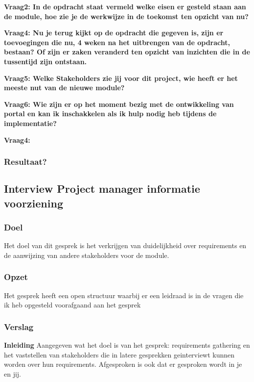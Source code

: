 \lipsum[01]
\bigskip

\textbf{Vraag2: In de opdracht staat vermeld welke eisen er gesteld staan aan de module, hoe zie je de werkwijze in de toekomst ten opzicht van nu?}

\lipsum[03]
\bigskip

\textbf{Vraag4: Nu je terug kijkt op de opdracht die gegeven is, zijn er toevoegingen die nu, 4 weken na het uitbrengen van de opdracht, bestaan? Of zijn er zaken veranderd ten opzicht van inzichten die in de tussentijd zijn ontstaan.}

\lipsum[05]
\bigskip

\textbf{Vraag5: Welke Stakeholders zie jij voor dit project, wie heeft er het meeste nut van de nieuwe module? }

\lipsum[06]
\bigskip

\textbf{Vraag6: Wie zijn er op het moment bezig met de ontwikkeling van portal en kan ik inschakkelen als ik hulp nodig heb tijdens de implementatie?}

\lipsum[09]
\bigskip

\textbf{Vraag4: }

\lipsum[07]

\subsubsection{Resultaat?}

\subsection{Interview Project manager informatie voorziening }

\subsubsection{Doel}
Het doel van dit gesprek is het verkrijgen van duidelijkheid over requirements en de aanwijzing van andere stakeholders voor de module.

\subsubsection{Opzet}
Het gesprek heeft een open structuur waarbij er een leidraad is in de vragen die ik heb opgesteld voorafgaand aan het gesprek

\subsubsection{Verslag}
\textbf{Inleiding}
Aangegeven wat het doel is van het gesprek: requirements gathering en het vaststellen van stakeholders die in latere gesprekken geinterviewt kunnen worden over hun requirements. Afgesproken is ook dat er gesproken wordt in je en jij.

